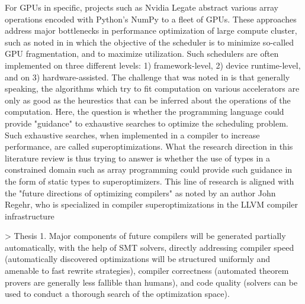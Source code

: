 \documentclass[10pt,a4paper]{article}
\begin{document}
For GPUs in specific, projects such as Nvidia Legate \cite{LegateNumpyBauer2019} abstract various array operations encoded with Python's NumPy to a fleet of GPUs.
These approaches address major bottlenecks in performance optimization of large compute cluster, such as noted in \cite{BewareOfFragmWeng2023} in which the objective of the scheduler is to minimize so-called GPU fragmentation, and to maximize utilization.
Such schedulers are often implemented on three different levels: 1) framework-level, 2) device runtime-level, and on 3) hardware-assisted.
The challenge that was noted in \cite{doctoral_thesis_mogers} is that generally speaking, the algorithms which try to fit computation on various accelerators are only as good as the heurestics that can be inferred about the operations of the computation.
Here, the question is whether the programming language could provide "guidance" to exhaustive searches to optimize the scheduling problem.
Such exhaustive searches, when implemented in a compiler to increase performance, are called superoptimizations.
What the research direction in this literature review is thus trying to answer is whether the use of types in a constrained domain such as array programming could provide such guidance in the form of static types to superoptimizers.
This line of research is aligned with the "future directions of optimizing compilers" as noted by an author John Regehr, who is specialized in compiler superoptimizations in the LLVM compiler infrastructure \cite{FutureDirectioLopes2018}

> Thesis 1. Major components of future compilers will be generated partially automatically, with the help of SMT solvers, directly addressing compiler speed (automatically discovered optimizations will be structured uniformly and amenable to fast rewrite strategies), compiler correctness (automated theorem provers are generally less fallible than humans), and code quality (solvers can be used to conduct a thorough search of the optimization space).
\end{document}
